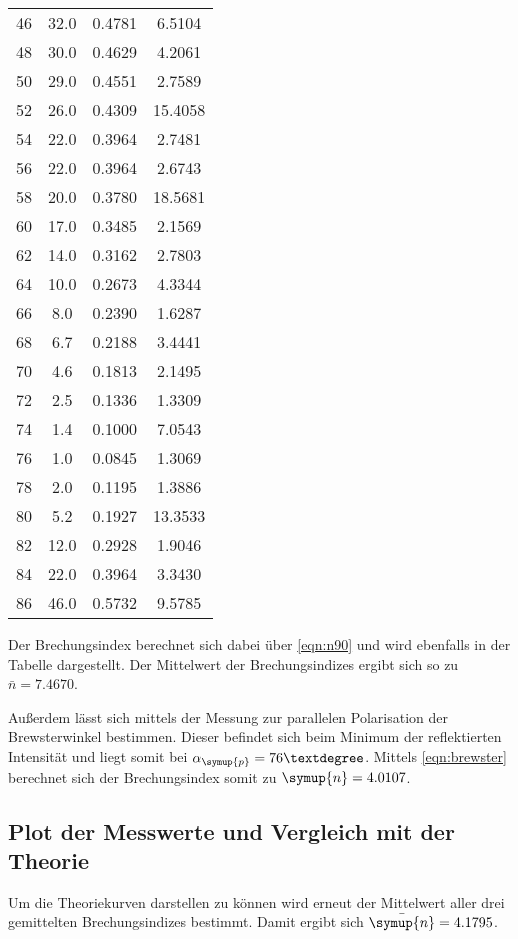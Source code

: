 \begin{table}
\begin{tabular}{c c c c}
        \midrule
        46&32.0&0.4781&6.5104 \\
        48&30.0&0.4629&4.2061 \\
        50&29.0&0.4551&2.7589 \\
       52&26.0&0.4309&15.4058 \\
        54&22.0&0.3964&2.7481 \\
        56&22.0&0.3964&2.6743 \\
       58&20.0&0.3780&18.5681 \\
        60&17.0&0.3485&2.1569 \\
        62&14.0&0.3162&2.7803 \\
        64&10.0&0.2673&4.3344 \\
         66&8.0&0.2390&1.6287 \\
         68&6.7&0.2188&3.4441 \\
         70&4.6&0.1813&2.1495 \\
         72&2.5&0.1336&1.3309 \\
         74&1.4&0.1000&7.0543 \\
         76&1.0&0.0845&1.3069 \\
         78&2.0&0.1195&1.3886 \\
        80&5.2&0.1927&13.3533 \\
        82&12.0&0.2928&1.9046 \\
        84&22.0&0.3964&3.3430 \\
        86&46.0&0.5732&9.5785 \\
        \bottomrule
    \end{tabular}
    \label{tab:Pol90}
\end{table}
Der Brechungsindex berechnet sich dabei über \autoref{eqn:n90} und wird ebenfalls in der Tabelle dargestellt. 
Der Mittelwert der Brechungsindizes ergibt sich so zu $\bar{n}= 7.4670$.

Außerdem lässt sich mittels der Messung zur parallelen Polarisation der Brewsterwinkel bestimmen. Dieser befindet sich beim Minimum der 
reflektierten Intensität und liegt somit bei $\alpha_{\symup{p}} = 76°$. Mittels \autoref{eqn:brewster} berechnet sich der Brechungsindex somit zu  
$\symup{n} = 4.0107$.

\subsection{Plot der Messwerte und Vergleich mit der Theorie}
Um die Theoriekurven darstellen zu können wird erneut der Mittelwert aller drei gemittelten Brechungsindizes bestimmt. Damit ergibt sich 
$\bar{\symup{n}} = 4.1795$.

